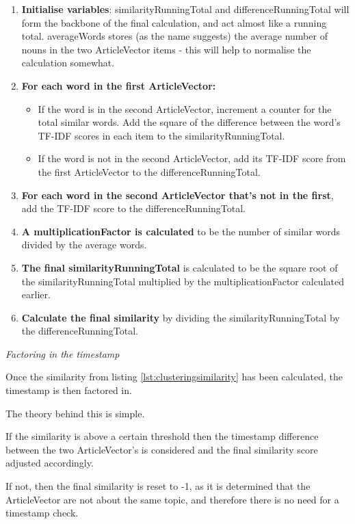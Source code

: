 \documentclass[12pt]{article}
\begin{document}
\begin{enumerate}
	\item \textbf{Initialise variables}: similarityRunningTotal and differenceRunningTotal will form the backbone of the final calculation, and act almost like a running total. averageWords stores (as the name suggests) the average number of nouns in the two ArticleVector items - this will help to normalise the calculation somewhat. 
	\item \textbf{For each word in the first ArticleVector:}
		\begin{itemize}
			\item If the word is in the second ArticleVector, increment a counter for the total similar words. Add the square of the difference between the word's TF-IDF scores in each item to the similarityRunningTotal. 
			\item If the word is not in the second ArticleVector, add its TF-IDF score from the first ArticleVector to the differenceRunningTotal. 
		\end{itemize}
	\item \textbf{For each word in the second ArticleVector that's not in the first}, add the TF-IDF score to the differenceRunningTotal. 
	\item \textbf{A multiplicationFactor is calculated} to be the number of similar words divided by the average words. 
	\item \textbf{The final similarityRunningTotal} is calculated to be the square root of the similarityRunningTotal multiplied by the multiplicationFactor calculated earlier.
	\item \textbf{Calculate the final similarity} by dividing the similarityRunningTotal by the differenceRunningTotal. \\
\end{enumerate}

\emph{Factoring in the timestamp}

Once the similarity from listing \ref{lst:clusteringsimilarity} has been calculated, the timestamp is then factored in.

The theory behind this is simple. 

If the similarity is above a certain threshold then the timestamp difference between the two ArticleVector's is considered and the final similarity score adjusted accordingly. 

If not, then the final similarity is reset to -1, as it is determined that the ArticleVector are not about the same topic, and therefore there is no need for a timestamp check.
\end{document}
